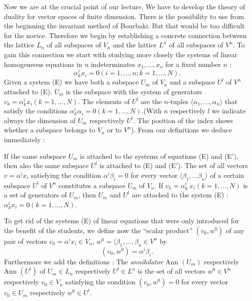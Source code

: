 Now we are at the crucial point of our lecture. We have to develop the
theory of duality for vector spaces of finite dimension. There is the
possibility to use from the beginning the invariant method of
Bourbaki. But that would be too difficult for the novice. Therefore we
begin by establishing a concrete connection between the lattice $L_n$
of all subspaces of $V_n$ and the lattice $L^n$ of all subspaces of
$V^n$. To gain this connection we start with studying more closely the
systems of linear homogeneous equations in $n$ indeterminates $x_1,
\ldots, x_n$ for a fixed number $n$ :
\begin{equation*}
\alpha^i_k x_i = 0 (i=1, \ldots, n ; k = 1, \ldots, N). \tag{E}
\end{equation*}
Given a system (E) we have both a subspace $U_m$ of $V_n$ and a
subspace $U^l$ of $V^n$ attached to (E). $U_m$ is the subspace with
the system of generators $v_k = \alpha^i_k x_i (k=1, \ldots, N)$. The
elements of $U^l$ are the $n$-tuples $\langle \alpha_1, \ldots,
\alpha_n \rangle$ that satisfy the conditions $\alpha^i_k \alpha_i = 0
(k = 1, \ldots, N)$.\pageoriginale (With $n$ respectively $l$ we
indicate always the dimension of $U_m$ respectively $U^l$. The
position of the index shows whether a subspace belongs to $V_n$ or to
$V^n$). From our definitions we deduce immediately :

If the same subspace $U_m$ is attached to the systems of equations (E)
and (E$'$), then also the same subspace $U^l$ is attached to (E) and
(E$'$). The set of all vectors $v = \alpha^i x_i$ satisfying the
condition $\alpha^i \beta_i =0$ for every vector $\langle \beta_1,
\ldots \beta_n \rangle$ of a certain subspace $U^l$ of $V^n$
constitutes a subspace $U_m$ of $V_n$. If $v_k = \alpha^i_k ~ x_i
(k=1, \ldots, N)$ is a set of generators of $U_m$, then $U_m$ and
$U^l$ are attached to the system (E) : $\alpha^i_k x_i = 0
(k=1,\ldots, N)$.

To get rid of the systems (E) of linear equations that were only
introduced for the benefit of the students, we define now the ``scalar
product'' $(v_0, w^0)$ of any pair of vectors $v_0 = \alpha^i x_i \in
V_n$, $w^0 = \langle \beta_1, \ldots, \beta_n \in V^n$ by
$$
(v_0, w^0) = \alpha^i \beta_i.
$$
Furthermore we add the definitions : The \textit{annihilator} Ann
$(U_m)$ respectively Ann $(U^l)$ of $U_m \in L_n$ respectively $U^l
\in L^n$ is the set of all vectors $w^0 \in V^n$ respectively $v_0 \in
V_n$ satisfying the condition $(v_0, w^0) = 0$ for every vector $v_0
\in U_m$ respectively $w^0 \in U^l$.

